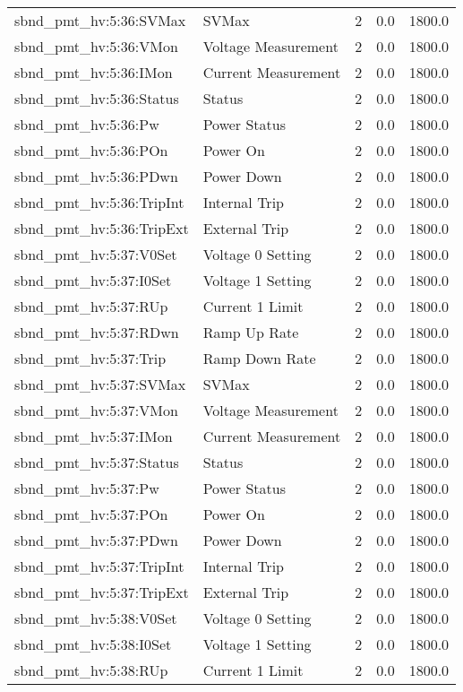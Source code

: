 \begin{center}
\begin{longtable}{l | l l l l }
sbnd\_pmt\_hv:5:36:SVMax & SVMax & 2 & 0.0 & 1800.0\\ 
sbnd\_pmt\_hv:5:36:VMon & Voltage Measurement & 2 & 0.0 & 1800.0\\ 
sbnd\_pmt\_hv:5:36:IMon & Current Measurement & 2 & 0.0 & 1800.0\\ 
sbnd\_pmt\_hv:5:36:Status & Status & 2 & 0.0 & 1800.0\\ 
sbnd\_pmt\_hv:5:36:Pw & Power Status & 2 & 0.0 & 1800.0\\ 
sbnd\_pmt\_hv:5:36:POn & Power On & 2 & 0.0 & 1800.0\\ 
sbnd\_pmt\_hv:5:36:PDwn & Power Down & 2 & 0.0 & 1800.0\\ 
sbnd\_pmt\_hv:5:36:TripInt & Internal Trip & 2 & 0.0 & 1800.0\\ 
sbnd\_pmt\_hv:5:36:TripExt & External Trip & 2 & 0.0 & 1800.0\\ 
sbnd\_pmt\_hv:5:37:V0Set & Voltage 0 Setting & 2 & 0.0 & 1800.0\\ 
sbnd\_pmt\_hv:5:37:I0Set & Voltage 1 Setting & 2 & 0.0 & 1800.0\\ 
sbnd\_pmt\_hv:5:37:RUp & Current 1 Limit & 2 & 0.0 & 1800.0\\ 
sbnd\_pmt\_hv:5:37:RDwn & Ramp Up Rate & 2 & 0.0 & 1800.0\\ 
sbnd\_pmt\_hv:5:37:Trip & Ramp Down Rate & 2 & 0.0 & 1800.0\\ 
sbnd\_pmt\_hv:5:37:SVMax & SVMax & 2 & 0.0 & 1800.0\\ 
sbnd\_pmt\_hv:5:37:VMon & Voltage Measurement & 2 & 0.0 & 1800.0\\ 
sbnd\_pmt\_hv:5:37:IMon & Current Measurement & 2 & 0.0 & 1800.0\\ 
sbnd\_pmt\_hv:5:37:Status & Status & 2 & 0.0 & 1800.0\\ 
sbnd\_pmt\_hv:5:37:Pw & Power Status & 2 & 0.0 & 1800.0\\ 
sbnd\_pmt\_hv:5:37:POn & Power On & 2 & 0.0 & 1800.0\\ 
sbnd\_pmt\_hv:5:37:PDwn & Power Down & 2 & 0.0 & 1800.0\\ 
sbnd\_pmt\_hv:5:37:TripInt & Internal Trip & 2 & 0.0 & 1800.0\\ 
sbnd\_pmt\_hv:5:37:TripExt & External Trip & 2 & 0.0 & 1800.0\\ 
sbnd\_pmt\_hv:5:38:V0Set & Voltage 0 Setting & 2 & 0.0 & 1800.0\\ 
sbnd\_pmt\_hv:5:38:I0Set & Voltage 1 Setting & 2 & 0.0 & 1800.0\\ 
sbnd\_pmt\_hv:5:38:RUp & Current 1 Limit & 2 & 0.0 & 1800.0\\ 

\end{longtable}
\end{center}
